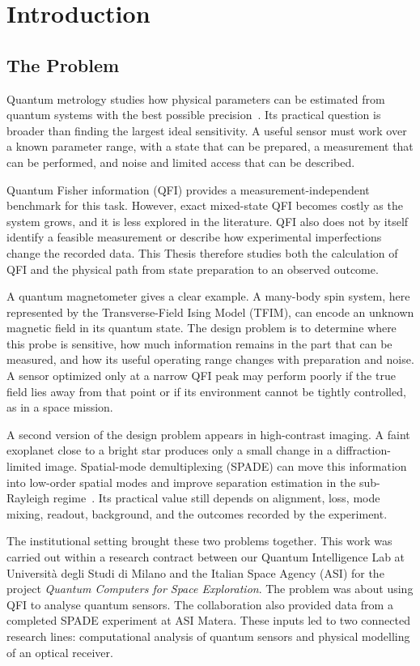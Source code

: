 \chapter{Introduction}
\label{ch:introduction}

\section{The Problem}

Quantum metrology studies how physical parameters can be estimated from quantum systems with the best possible precision~\cite{Maccone2020squeezing}.  Its practical question is broader than finding the largest ideal sensitivity.  A useful sensor must work over a known parameter range, with a state that can be prepared, a measurement that can be performed, and noise and limited access that can be described.

Quantum Fisher information (QFI) provides a measurement-independent benchmark for this task.  However, exact mixed-state QFI becomes costly as the system grows, and it is less explored in the literature.  QFI also does not by itself identify a feasible measurement or describe how experimental imperfections change the recorded data.  This Thesis therefore studies both the calculation of QFI and the physical path from state preparation to an observed outcome.

A quantum magnetometer gives a clear example.  A many-body spin system, here represented by the Transverse-Field Ising Model (TFIM), can encode an unknown magnetic field in its quantum state.  The design problem is to determine where this probe is sensitive, how much information remains in the part that can be measured, and how its useful operating range changes with preparation and noise.  A sensor optimized only at a narrow QFI peak may perform poorly if the true field lies away from that point or if its environment cannot be tightly controlled, as in a space mission.

A second version of the design problem appears in high-contrast imaging.  A faint exoplanet close to a bright star produces only a small change in a diffraction-limited image.  Spatial-mode demultiplexing (SPADE) can move this information into low-order spatial modes and improve separation estimation in the sub-Rayleigh regime~\cite{Santamaria2024single,Tsang2016quantum}.  Its practical value still depends on alignment, loss, mode mixing, readout, background, and the outcomes recorded by the experiment.

The institutional setting brought these two problems together.  This work was carried out within a research contract between our Quantum Intelligence Lab at Università degli Studi di Milano and the Italian Space Agency (ASI) for the project \emph{Quantum Computers for Space Exploration}.  The problem was about using QFI to analyse quantum sensors.  The collaboration also provided data from a completed SPADE experiment at ASI Matera.  These inputs led to two connected research lines: computational analysis of quantum sensors and physical modelling of an optical receiver.

